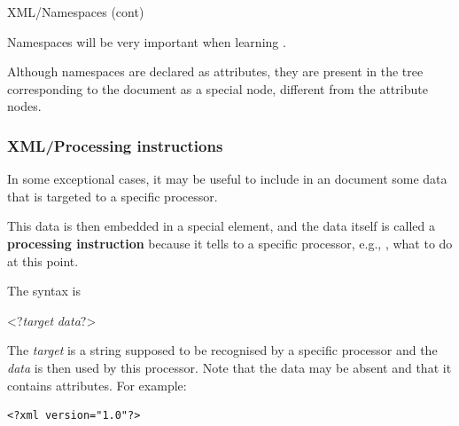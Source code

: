 %
\begin{frame}{XML/Namespaces (cont)}

Namespaces will be very important when learning \XSLT.

\bigskip

Although namespaces are declared as attributes, they are present in
the \XML tree corresponding to the document as a special node,
different from the attribute nodes.

\end{frame}

%
\begin{frame}[containsverbatim]
\frametitle{XML/Processing instructions}

In some exceptional cases, it may be useful to include in an \XML
document some data that is targeted to a specific \XML processor.

\bigskip

This data is then embedded in a special element, and the data itself
is called a \textbf{processing instruction} because it tells to a
specific processor, e.g., \Saxon, what to do at this point.

\bigskip

The syntax is
\begin{semiverbatim}
<?\textit{target} \textit{data}?>
\end{semiverbatim}
The \emph{target} is a string supposed to be recognised by a specific
\XML processor and the \emph{data} is then used by this
processor. Note that the data may be absent and that it contains
attributes. For example:
\begin{verbatim}
<?xml version="1.0"?>
\end{verbatim}

\end{frame}

